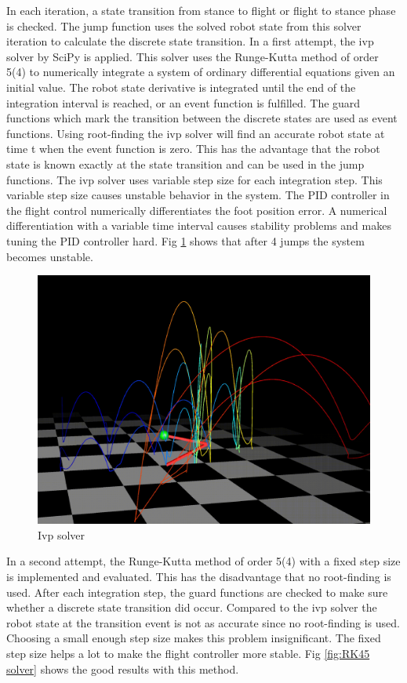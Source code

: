 \documentclass[journal,onecolumn]{IEEEtran}
\begin{document}
	In each iteration, a state transition from stance to flight or flight to stance phase is checked. The jump function uses the solved robot state from this solver iteration 
	to calculate the discrete state transition. 
	In a first attempt, the ivp solver by SciPy is applied. This solver uses the Runge-Kutta method of order 5(4) to numerically integrate a system of ordinary differential 
	equations given an initial value. The robot state derivative is integrated until the end of the integration interval is reached, or an event function is 
	fulfilled.  The guard functions which mark the transition between the discrete states are used as event functions. Using root-finding the ivp solver will find an 
	accurate robot state at time t when the event function is zero. This has the advantage that the robot state is known exactly at the state transition and can be used 
	in the jump functions. The ivp solver uses variable step size for each integration step. This variable step size causes unstable behavior in the system. The PID 
	controller in the flight control numerically differentiates the foot position error. A numerical differentiation with a variable time interval causes stability 
	problems and makes tuning the PID controller hard. Fig \ref{fig:ivp solver} shows that after 4 jumps the system becomes unstable.
	
	\begin{figure}[h]
		\centering
		\includegraphics[scale=0.11]{"assets/solver_ivp.png"}
		\caption{Ivp solver}
		\label{fig:ivp solver}
	\end{figure}
	
	In a second attempt, the Runge-Kutta method of order 5(4) with a fixed step size is implemented and evaluated. This has the disadvantage that no root-finding is used. 
	After each integration step, the guard functions are checked to make sure whether a discrete state transition did occur. Compared to the ivp solver the robot state at 
	the transition event is not as accurate since no root-finding is used. Choosing a small enough step size makes this problem insignificant. The fixed step size helps 
	a lot to make the flight controller more stable. Fig \ref{fig:RK45 solver} shows the good results with this method.
	
\end{document}

